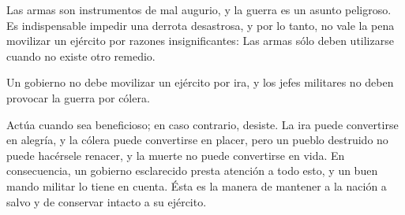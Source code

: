 Las armas son instrumentos de mal augurio, y la guerra es un asunto peligroso. Es indispensable impedir una derrota desastrosa, y por lo tanto, no vale la pena movilizar un ejército por razones insignificantes: Las armas sólo deben utilizarse cuando no existe otro remedio.

Un gobierno no debe movilizar un ejército por ira, y los jefes militares no deben provocar la guerra por cólera.

Actúa cuando sea beneficioso; en caso contrario, desiste. La ira puede convertirse en alegría, y la cólera puede convertirse en placer, pero un pueblo destruido no puede hacérsele renacer, y la muerte no puede convertirse en vida. En consecuencia, un gobierno esclarecido presta atención a todo esto, y un buen mando militar lo tiene en cuenta. Ésta es la manera de mantener a la nación a salvo y de conservar intacto a su ejército.

